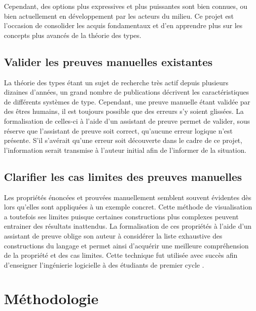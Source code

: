 \documentclass[a4paper, oneside, 12pt, titlepage]{article}
\begin{document}
Cependant, des options plus expressives et plus puissantes sont bien connues, ou bien
actuellement en développement par les acteurs du milieu. Ce projet est l'occasion de consolider
les acquis fondamentaux et d'en apprendre plus sur les concepts plus avancés de la théorie des
types.

\subsection{Valider les preuves manuelles existantes}

La théorie des types étant un sujet de recherche très actif depuis plusieurs dizaines d'années, un
grand nombre de publications décrivent les caractéristiques de différents systèmes de type.
Cependant, une preuve manuelle étant validée par des êtres humains, il est toujours possible que des
erreurs s'y soient glissées. La formalisation de celles-ci à l'aide d'un assistant de preuve permet
de valider, sous réserve que l'assistant de preuve soit correct, qu'aucune erreur logique n'est
présente. S'il s'avérait qu'une erreur soit découverte dans le cadre de ce projet, l'information
serait transmise à l'auteur initial afin de l'informer de la situation.

\subsection{Clarifier les cas limites des preuves manuelles}

Les propriétés énoncées et prouvées manuellement semblent souvent évidentes dès lors qu'elles sont
appliquées à un exemple concret. Cette méthode de visualisation a toutefois ses limites puisque
certaines constructions plus complexes peuvent entrainer des résultats inattendus. La formalisation
de ces propriétés à l'aide d'un assistant de preuve oblige son auteur à considérer la liste
exhaustive des constructions du langage et permet ainsi d'acquérir une meilleure compréhension de la
propriété et des cas limites. Cette technique fut utilisée avec succès afin d'enseigner l'ingénierie
logicielle à des étudiants de premier cycle \cite{page:thm-proving-undergraduates, pierce:LambdaTA,
nipkow:teaching-proof-assistant}.

\section{Méthodologie}

%
\end{document}
